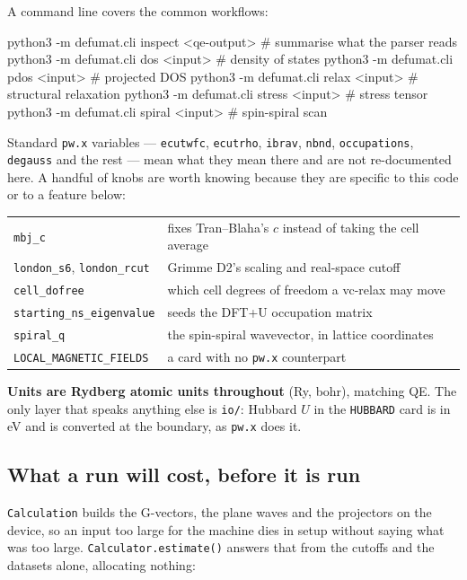 \documentclass[11pt,a4paper]{article}
\newcommand{\code}[1]{\texttt{\small #1}}
\begin{document}
A command line covers the common workflows:

\begin{shcode}
python3 -m defumat.cli inspect <qe-output>   # summarise what the parser reads
python3 -m defumat.cli dos     <input>       # density of states
python3 -m defumat.cli pdos    <input>       # projected DOS
python3 -m defumat.cli relax   <input>       # structural relaxation
python3 -m defumat.cli stress  <input>       # stress tensor
python3 -m defumat.cli spiral  <input>       # spin-spiral scan
\end{shcode}

Standard \code{pw.x} variables --- \code{ecutwfc}, \code{ecutrho}, \code{ibrav},
\code{nbnd}, \code{occupations}, \code{degauss} and the rest --- mean what they
mean there and are not re-documented here. A handful of knobs are worth knowing
because they are specific to this code or to a feature below:

\begin{center}
\small
\begin{tabular}{@{}ll@{}}
\toprule
\code{mbj\_c} & fixes Tran--Blaha's $c$ instead of taking the cell average \\
\code{london\_s6}, \code{london\_rcut} & Grimme D2's scaling and real-space cutoff \\
\code{cell\_dofree} & which cell degrees of freedom a vc-relax may move \\
\code{starting\_ns\_eigenvalue} & seeds the DFT+U occupation matrix \\
\code{spiral\_q} & the spin-spiral wavevector, in lattice coordinates \\
\code{LOCAL\_MAGNETIC\_FIELDS} & a card with no \code{pw.x} counterpart \\
\bottomrule
\end{tabular}
\end{center}

\textbf{Units are Rydberg atomic units throughout} (Ry, bohr), matching QE. The
only layer that speaks anything else is \code{io/}: Hubbard $U$ in the
\code{HUBBARD} card is in eV and is converted at the boundary, as \code{pw.x}
does it.

\subsection*{What a run will cost, before it is run}

\code{Calculation} builds the G-vectors, the plane waves and the projectors on
the device, so an input too large for the machine dies in setup without saying
what was too large. \code{Calculator.estimate()} answers that from the cutoffs
and the datasets alone, allocating nothing:
\end{document}
